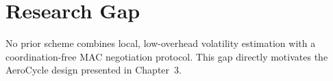 \section{Research Gap}
No prior scheme combines local, low-overhead volatility estimation with a coordination-free
MAC negotiation protocol. This gap directly motivates the AeroCycle design presented in
Chapter~3.

